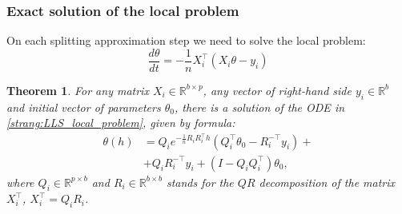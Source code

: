 \documentclass{article}
\newtheorem{theorem}{Theorem}
\begin{document}
\subsubsection{Exact solution of the local problem}
On each splitting approximation step we need to solve the local problem:
\begin{equation}\label{strang:LLS_local_problem}
\frac{d \theta}{d t} = - \frac{1}{n} X_i^\top( X_i \theta - y_i)
\end{equation}
\begin{theorem}\label{strang:LLS_local_solution} For any matrix $X_i \in \mathbb{R}^{b \times p}$, any vector of right-hand side $y_i \in \mathbb{R}^{b}$ and initial vector of parameters $\theta_0$, there is a solution of the ODE in \eqref{strang:LLS_local_problem}, given by formula:
\begin{equation}\label{strang:LLS_local_solution_formula}
\begin{split}
\theta(h) &= Q_i e^{-\frac{1}{n}R_iR_i^\top h} \left( Q_i^\top \theta_0 - R_i^{-\top}y_i\right) + \\ &+ Q_iR_i^{-\top}y_i + (I - Q_iQ_i^\top)\theta_0,
\end{split}
\end{equation}
where $Q_i \in \mathbb{R}^{p \times b}$ and $R_i \in \mathbb{R}^{b \times b}$ stands for the $QR$ decomposition of the matrix $X_i^\top$, $X_i^\top = Q_i R_i$.
\end{theorem}
\end{document}
